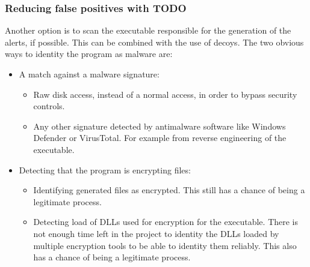 \subsubsection{Reducing false positives with TODO}
Another option is to scan the executable responsible for the generation of the alerts, if possible.
This can be combined with the use of decoys.
\linej
The two obvious ways to identity the program as malware are:
\begin{itemize}
	\item A match against a malware signature:
	\begin{itemize}
		\item Raw disk access, instead of a normal access, in order to bypass security controls.
		\item Any other signature detected by antimalware software like Windows Defender or VirusTotal. For example from reverse engineering of the executable.
	\end{itemize}
	\item Detecting that the program is encrypting files:
	\begin{itemize}
		\item Identifying generated files as encrypted. This still has a chance of being a legitimate process.
		\item Detecting load of DLLs used for encryption for the executable. There is not enough time left in the project to identity the DLLs loaded by multiple encryption tools to be able to identity them reliably. This also has a chance of being a legitimate process.
	\end{itemize}
\end{itemize}
\linej

